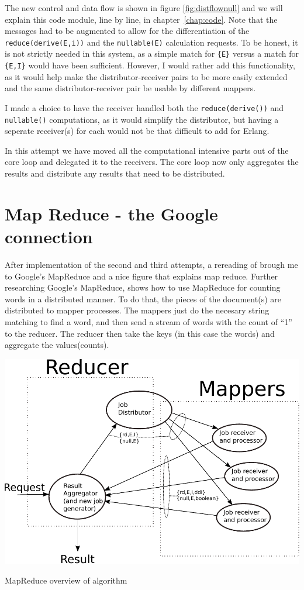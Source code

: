 \documentclass[a4paper,11pt]{report}
\begin{document}
The new control and data flow is shown in figure
\ref{fig:distflownull} and we will explain this code module, line by
line, in chapter~\ref{chap:code}. Note that the messages had to be
augmented to allow for the differentiation of the \sloppy
\texttt{reduce(derive(E,i))} and the \texttt{nullable(E)} calculation
requests. To be honest, it is not strictly needed in this system, as a
simple match for \texttt{\{E\}} versus a match for \texttt{\{E,I\}}
would have been sufficient.	 However, I would rather add this
functionality, as it would help make the distributor-receiver pairs to
be more easily extended and the same distributor-receiver pair be
usable by different mappers.


I made a choice to have the receiver handled both the
\texttt{reduce(derive())} and \texttt{nullable()} computations, as it
would simplify the distributor, but having a seperate receiver(s) for
each would not be that difficult to add for Erlang.

In this attempt we have moved all the computational intensive parts
out of the core loop and delegated it to the receivers. The core loop
now only aggregates the results and distribute any results that need
to be distributed.

\section{Map Reduce - the Google connection}


After implementation of the second and third attempts, a rereading of
\cite{Armstrong} brough me to Google's MapReduce and a nice figure
that explains map reduce. Further researching
Google's MapReduce, \cite{Dean} shows how to use MapReduce for
counting words in a distributed manner. To do that, the pieces of the
document(s) are distributed to mapper processes. The mappers just do the
necesary string matching to find a word, and then send a stream
of words with the count of ``1'' to the reducer. The reducer then take
the keys (in this case the words) and aggregate the values(counts).

\begin{Figure}[htb]
	\centering
	\includegraphics[scale=0.8]{MapReduce-process.pdf}
	\caption{MapReduce overview of algorithm}
	\label{fig:mapreduce}
\end{Figure}
\end{document}

